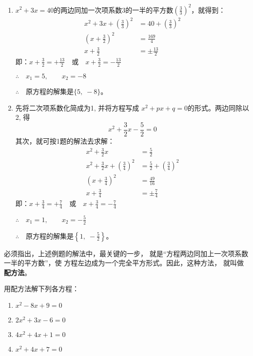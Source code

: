 \begin{solution}
\begin{enumerate}
    \item $x^2+3x=40$的两边同加一次项系数3的一半的平方数$\left(\frac{3}{3}\right)^2$，就得到：
\begin{align*}
    x^2+3x+ \left(\frac{3}{3}\right)^2&=40+\left(\frac{3}{3}\right)^2\\
    \left(x+\frac{3}{2}\right)^2&=\frac{169}{4}\\
    x+\frac{3}{2}&=\pm\frac{13}{2}  \tag{平方根的定义}
\end{align*}
即：$x+\frac{3}{2}=+\frac{13}{2}\quad \text{或}\quad x+\frac{3}{2}=-\frac{13}{2}$

$\therefore\quad x_1=5,\qquad x_2=-8$

$\therefore\quad $原方程的解集是$\{5,\;-8\}$。
\item 先将二次项系数化简成为1, 并将方程写成
$x^2+px+q=0$的形式。两边同除以2, 得
\[x^2+\frac{3}{2}x-\frac{5}{2}=0 \]
其次，就可按1题的解法去求解：
\begin{align*}
    x^2+\frac{3}{2}x&=\frac{5}{2}\tag{移项}\\
    x^2+\frac{3}{2}x+\left(\frac{3}{4}\right)^2&=\frac{5}{2}+\left(\frac{3}{4}\right)^2 \tag{配方}\\
    \left(x+\frac{3}{4}\right)^2&=\frac{49}{16}\\
    x+\frac{3}{4}&=\pm\frac{7}{4} \tag{平方根意义}
\end{align*}
即：$x+\frac{3}{4}=+\frac{7}{4} \quad \text{或}\quad x+\frac{3}{4}=-\frac{7}{4} $

$\therefore\quad x_1=1,\qquad x_2=-\frac{5}{2}$

$\therefore\quad $原方程的解集是$\left\{1,\;-\frac{5}{2}\right\}$。
\end{enumerate}
\end{solution}

必须指出，上述例题的解法中，最关键的一步，
就是“方程两边同加上一次项系数一半的平方数”，使
方程左边成为一个完全平方形式。因此，这种方法，
就叫做\textbf{配方法}。

\begin{example}
    用配方法解下列各方程：
\begin{multicols}{2}
\begin{enumerate}
    \item $x^2-8x+9=0$
\item $2x^2+3x-6=0$
\item $4x^2+4x+1=0$
\item $x^2+4x+7=0$
\end{enumerate}
\end{multicols}
\end{example}

